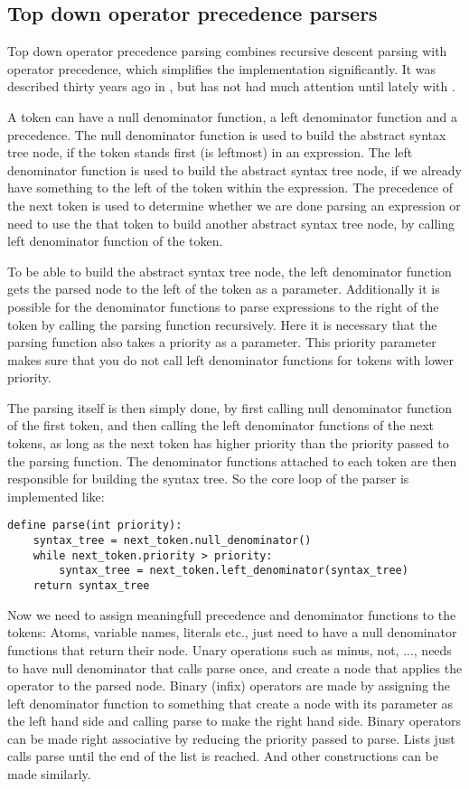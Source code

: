 \documentclass[11pt]{report}
\begin{document}
\subsection{Top down operator precedence parsers}
\label{tdop}
Top down operator precedence parsing combines recursive descent parsing with operator precedence, which simplifies the implementation significantly.
It was described thirty years ago in  \cite{top-down-operator-precedence}, but has not had much attention until lately with  \cite{beautiful-code}.

A token can have a null denominator function, a left denominator function and a precedence.
The null denominator function is used to build the abstract syntax tree node, if the token stands first (is leftmost) in an expression.
The left denominator function is used to build the abstract syntax tree node, if we already have something to the left of the token within the expression.
The precedence of the next token is used to determine whether we are done parsing an expression or need to use the that token to build another abstract syntax tree node, by calling left denominator function of the token.

To be able to build the abstract syntax tree node, the left denominator function gets the parsed node to the left of the token as a parameter. Additionally it is possible for the denominator functions to parse expressions to the right of the token by calling the parsing function recursively. Here it is necessary that the parsing function also takes a priority as a parameter. This priority parameter makes sure that you do not call left denominator functions for tokens with lower priority.

The parsing itself is then simply done, by first calling null denominator function of the first token, and then calling the left denominator functions of the next tokens, as long as the next token has higher priority than the priority passed to the parsing function.
The denominator functions attached to each token are then responsible for building the syntax tree.
So the core loop of the parser is implemented like:
\begin{verbatim}
define parse(int priority):
    syntax_tree = next_token.null_denominator()
    while next_token.priority > priority:
        syntax_tree = next_token.left_denominator(syntax_tree)
    return syntax_tree
\end{verbatim}

Now we need to assign meaningfull precedence and denominator functions to the tokens:
Atoms, variable names, literals etc., just need to have a null denominator functions that return their node. Unary operations such as minus, not, ..., needs to have null denominator that calls parse once, and create a node that applies the operator to the parsed node.
Binary (infix) operators are made by assigning the left denominator function to something that create a node with its parameter as the left hand side and calling parse to make the right hand side. Binary operators can be made right associative by reducing the priority passed to parse.
Lists just calls parse until the end of the list is reached. And other constructions can be made similarly. 
\end{document}
